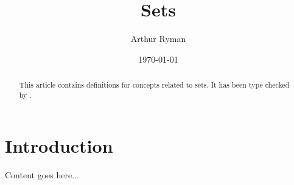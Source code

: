 \documentclass{amsart}
\begin{document}
    \title{Sets}
    \author{Arthur Ryman}
    \date{\today}

    \begin{abstract}
        This article contains \ZN\cite{spivey-zrm} definitions for
        concepts related to sets.
        It has been type checked by \fuzz\cite{spivey-fm}.
    \end{abstract}

    \maketitle

    \tableofcontents

    \section{Introduction}

    Content goes here...

    \printbibliography
\end{document}
